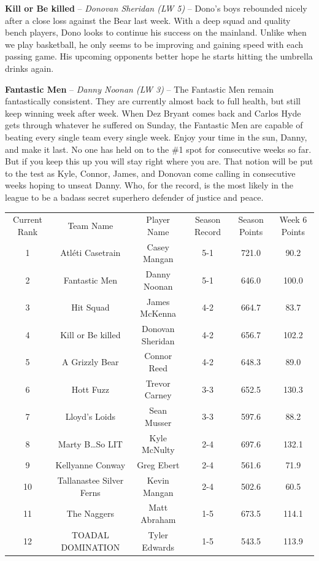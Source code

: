 \documentclass[11pt,letterpaper]{article}
\begin{document}
\begin{etaremune}
\item \textbf{Kill or Be killed} -- \textit{Donovan Sheridan (LW 5)} -- Dono's boys rebounded nicely after a close loss against the Bear last week. With a deep squad and quality bench players, Dono looks to continue his success on the mainland. Unlike when we play basketball, he only seems to be improving and gaining speed with each passing game. His upcoming opponents better hope he starts hitting the umbrella drinks again. 
\item \textbf{Fantastic Men} -- \textit{Danny Noonan (LW 3)} -- The Fantastic Men remain fantastically consistent. They are currently almost back to full health, but still keep winning week after week. When Dez Bryant comes back and Carlos Hyde gets through whatever he suffered on Sunday, the Fantastic Men are capable of beating every single team every single week. Enjoy your time in the sun, Danny, and make it last. No one has held on to the \#1 spot for consecutive weeks so far. But if you keep this up you will stay right where you are. That notion will be put to the test as Kyle, Connor, James, and Donovan come calling in consecutive weeks hoping to unseat Danny. Who, for the record, is the most likely in the league to be a badass secret superhero defender of justice and peace. 
\end{etaremune}


\newpage
{}
\vspace{-25pt}
\begin{table} [h]
\footnotesize
\begin{center}
\begin{tabular} { c c c c c c }
\\[3mm] Current Rank & Team Name & Player Name & Season Record &  Season Points & Week 6 Points
\\[3mm] 1 & Atl\'{e}ti Casetrain & Casey Mangan & 5-1 & 721.0 & 90.2
\\ 2 & Fantastic Men & Danny Noonan & 5-1 & 646.0 & 100.0
\\ 3 & Hit Squad & James McKenna & 4-2 & 664.7 & 83.7
\\ 4 & Kill or Be killed & Donovan Sheridan & 4-2 & 656.7 & 102.2
\\ 5 &  A Grizzly Bear & Connor Reed & 4-2 & 648.3 & 89.0
\\ 6 & Hott Fuzz & Trevor Carney & 3-3 & 652.5 & 130.3
\\ 7 & Lloyd's Loids & Sean Musser & 3-3 & 597.6 & 88.2
\\ 8 & Marty B\dots So LIT & Kyle McNulty & 2-4 & 697.6 & 132.1
\\ 9 & Kellyanne Conway & Greg Ebert & 2-4 & 561.6 & 71.9
\\ 10 & Tallanastee Silver Ferns & Kevin Mangan & 2-4 & 502.6 & 60.5
\\ 11 & The Naggers & Matt Abraham & 1-5 & 673.5 & 114.1
\\ 12 & TOADAL DOMINATION & Tyler Edwards & 1-5 & 543.5 & 113.9
\end{tabular}
\end{center}
\end{table}
\end{document}

